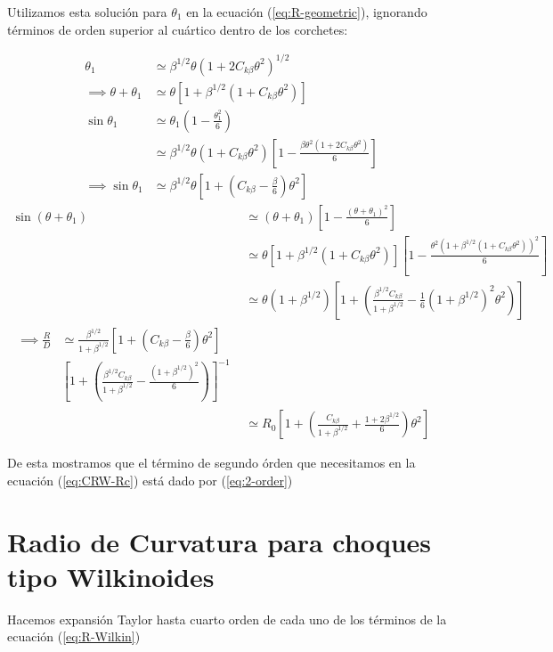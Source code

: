 Utilizamos esta solución para $\theta_1$ en la ecuación (\ref{eq:R-geometric}), ignorando términos de orden superior al cuártico
dentro de los corchetes:

\begin{align}
  \theta_1 &\simeq \beta^{1/2}\theta\left(1 + 2C_{k\beta}\theta^2\right)^{1/2} \\
  \implies \theta + \theta_1 &\simeq \theta\left[1 + \beta^{1/2}\left(1 + C_{k\beta}\theta^2\right)\right]\\ 
  \sin\theta_1 &\simeq \theta_1\left(1 - \frac{\theta^2_1}{6}\right) \\
  &\simeq \beta^{1/2}\theta\left(1 + C_{k\beta}\theta^2\right)\left[1 - \frac{\beta\theta^2\left(1 + 2C_{k\beta}\theta^2\right)}{6}\right]\\
  \implies \sin\theta_1 &\simeq \beta^{1/2}\theta\left[1 + \left(C_{k\beta}- \frac{\beta}{6}\right)\theta^2\right]
\end{align}
\begin{align}
  \sin\left(\theta + \theta_1 \right) &\simeq \left(\theta + \theta_1\right)\left[1 - \frac{\left(\theta + \theta_1\right)^2}{6}\right] \\
           &\simeq \theta\left[1 + \beta^{1/2}\left(1 + C_{k\beta}\theta^2\right)\right] \left[1 - \frac{\theta^2\left(1 + \beta^{1/2}
             \left(1 + C_{k\beta}\theta^2\right)\right)^2}{6}\right] \\
           &\simeq \theta\left(1 + \beta^{1/2}\right)\left[1 + \left(\frac{\beta^{1/2}C_{k\beta}}{1 + \beta^{1/2}} - \frac{1}{6}\left(1 + \beta^{1/2}\right)^2
             \theta^2\right)\right]\\
\begin{split}
  \implies \frac{R}{D} &\simeq \frac{\beta^{1/2}}{1 + \beta^{1/2}}\left[1 + \left(C_{k\beta} - \frac{\beta}{6}\right)\theta^2\right] \\
               & \left[1 + \left(\frac{\beta^{1/2}C_{k\beta}}{1 + \beta^{1/2}} - \frac{\left(1 + \beta^{1/2}\right)^2}{6}\right)\right]^{-1} 
\end{split}\\
  &\simeq R_0 \left[1 + \left(\frac{C_{k\beta}}{1+\beta^{1/2}} + \frac{1+2\beta^{1/2}}{6}\right)\theta^2\right] 
\end{align}

De esta mostramos que el término de segundo órden que necesitamos en la ecuación (\ref{eq:CRW-Rc}) está dado por (\ref{eq:2-order})


\section{Radio de Curvatura para choques tipo Wilkinoides}
\label{sec:Rc-Wilkin}
Hacemos expansión Taylor hasta cuarto orden de cada uno de los términos de la ecuación (\ref{eq:R-Wilkin})

